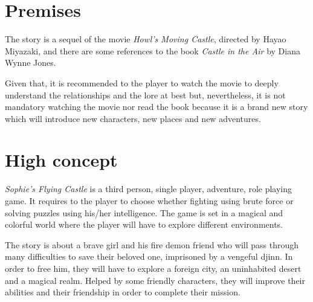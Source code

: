 \section{Premises}

The story is a sequel of the movie \textit{Howl’s Moving Castle}, directed by Hayao Miyazaki, and there are some references to the book \textit{Castle in the Air} by Diana Wynne Jones.

Given that, it is recommended to the player to watch the movie to deeply understand the relationships and the lore at best but, nevertheless, it is not mandatory watching the movie nor read the book because it is a brand new story which will introduce new characters, new places and new adventures.

{\let\clearpage\relax\section{High concept}}

\textit{Sophie's Flying Castle} is a third person, single player, adventure, role playing game. It requires to the player to choose whether fighting using brute force or solving puzzles using his/her intelligence. The game is set in a magical and colorful world where the player will have to explore different environments. 

The story is about a brave girl and his fire demon friend who will pass through many difficulties to save their beloved one, imprisoned by a vengeful djinn. In order to free him, they will have to explore a foreign city, an uninhabited desert and a magical realm. Helped by some friendly characters, they will improve their abilities and their friendship in order to complete their mission.
